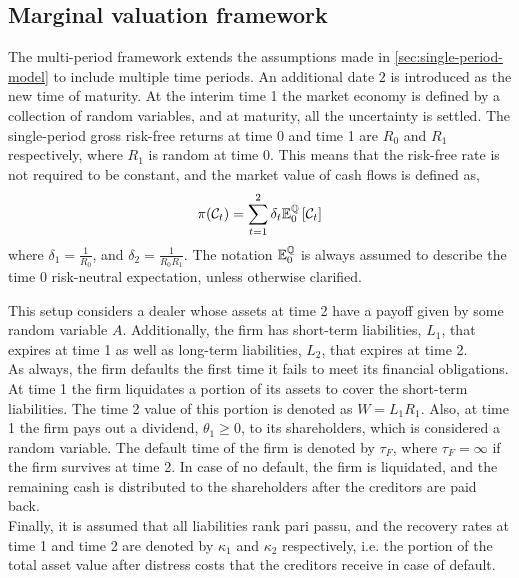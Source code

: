 \documentclass[main.tex]{subfiles}
\begin{document}
    \subsection{Marginal valuation framework}
        The multi-period framework extends the assumptions made in \cref{sec:single-period-model} to include multiple time periods.
        An additional date $2$ is introduced as the new time of maturity.
        At the interim time 1 the market economy is defined by a collection of random variables,
        and at maturity, all the uncertainty is settled. 
        The single-period gross risk-free returns at time 0 and time 1 are $R_0$ and $R_1$ respectively, where $R_1$ is random at time 0.
        This means that the risk-free rate is not required to be constant,
        and the market value of cash flows is defined as,
        \begin{equation}
            \pi(\mathcal{C}_{t}) =
            \sum_{t=1}^{2}
            \delta_t \mathbb{E}_{0}^{\mathbb{Q}}\left[\mathcal{C}_{t}\right]
        \end{equation}
        where $\delta_1 = \frac{1}{R_0}$,
        and $\delta_2 = \frac{1}{R_{0}R_{1}}$.
        The notation $\mathbb{E}_{0}^{\mathbb{Q}}$ is always assumed to describe the time 0 risk-neutral expectation, unless otherwise clarified.

        This setup considers a dealer whose assets at time 2 have a payoff given by some random variable $A$.
        Additionally, the firm has short-term liabilities, $L_1$, that expires at time 1 as well as long-term liabilities, $L_2$, that expires at time 2.
        \\
        As always, the firm defaults the first time it fails to meet its financial obligations.
        At time 1 the firm liquidates a portion of its assets to cover the short-term liabilities.
        The time 2 value of this portion is denoted as $W = L_1 R_1$.
        Also, at time 1 the firm pays out a dividend, $\theta_1 \geq 0$, to its shareholders,
        which is considered a random variable.
        The default time of the firm is denoted by $\tau_{F}$,
        where $\tau_{F} = \infty$ if the firm survives at time 2.
        In case of no default, the firm is liquidated, and the remaining cash is distributed to the shareholders after the creditors are paid back.
        \\
        Finally, it is assumed that all liabilities rank pari passu,
        and the recovery rates at time 1 and time 2 are denoted by $\kappa_1$ and $\kappa_2$ respectively,
        i.e. the portion of the total asset value after distress costs that the creditors receive in case of default.
\end{document}
